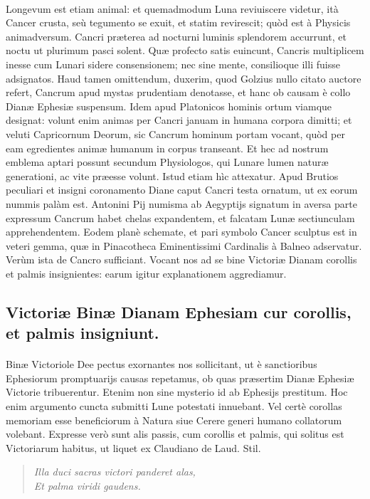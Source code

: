 \documentclass[a4paper, 11pt, oneside, polutonikogreek, latin]{article}
\begin{document}
\paragraph{}
Longevum est etiam animal: et quemadmodum Luna reviuiscere videtur, ità Cancer crusta, seù tegumento se exuit, et statim revirescit; quòd est à Physicis animadversum. Cancri præterea ad nocturni luminis splendorem accurrunt, et noctu ut plurimum pasci solent. Quæ profecto satis euincunt, Cancris multiplicem inesse cum Lunari sidere consensionem; nec sine mente, consilioque illi fuisse adsignatos. Haud tamen omittendum, duxerim, quod Golzius nullo citato auctore refert, Cancrum apud mystas prudentiam denotasse, et hanc ob causam è collo Dianæ Ephesiæ suspensum. Idem apud Platonicos hominis ortum viamque designat: volunt enim animas per Cancri januam in humana corpora dimitti; et veluti Capricornum Deorum, sic Cancrum hominum portam vocant, quòd per eam egredientes animæ humanum in corpus transeant. Et hec ad nostrum emblema aptari possunt secundum Physiologos, qui Lunare lumen naturæ generationi, ac vite præesse volunt. Istud etiam hìc attexatur. Apud Brutios peculiari et insigni coronamento Diane caput Cancri testa ornatum, ut ex eorum nummis palàm est. Antonini Pij numisma ab Aegyptijs signatum in aversa parte expressum Cancrum habet chelas expandentem, et falcatam Lunæ sectiunculam apprehendentem. Eodem planè schemate, et pari symbolo Cancer sculptus est in veteri gemma, quæ in Pinacotheca Eminentissimi Cardinalis à Balneo adservatur. Verùm ista de Cancro sufficiant. Vocant nos ad se bine Victoriæ Dianam corollis et palmis insignientes: earum igitur explanationem aggrediamur.
\clearpage
\subsection{Victoriæ Binæ Dianam Ephesiam cur corollis, et palmis insigniunt.}
\paragraph{}
Binæ Victoriole Dee pectus exornantes nos sollicitant, ut è sanctioribus Ephesiorum promptuarijs causas repetamus, ob quas præsertim Dianæ Ephesiæ Victorie tribuerentur. Etenim non sine mysterio id ab Ephesijs prestitum. Hoc enim argumento cuncta submitti Lune potestati innuebant. Vel certè corollas memoriam esse beneficiorum à Natura siue Cerere generi humano collatorum volebant. Expresse verò sunt alis passis, cum corollis et palmis, qui solitus est Victoriarum habitus, ut liquet ex Claudiano de Laud. Stil.
\begin{quote}
\emph{Illa duci sacras victori panderet alas,}\\
\emph{Et palma viridi gaudens.}\\
\end{quote}
\vspace*{-8mm}
\end{document}

